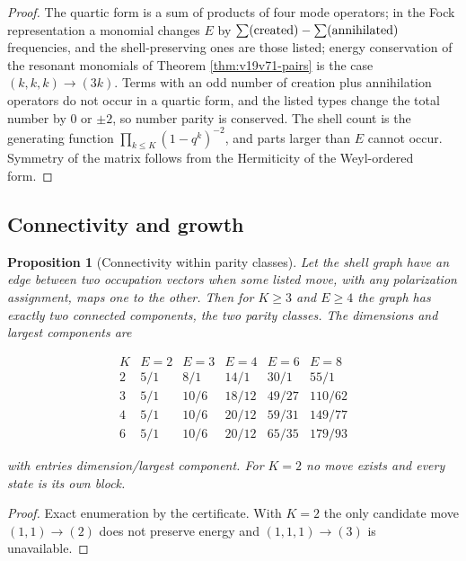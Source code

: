 \documentclass[11pt]{article}
\newtheorem{proposition}[theorem]{Proposition}
\theoremstyle{remark}
\begin{document}
\begin{proof}
The quartic form is a sum of products of four mode operators; in the
Fock representation a monomial changes \(E\) by \(\sum(\hbox{created})-\sum(\hbox{annihilated})\)
frequencies, and the shell-preserving ones are those listed; energy
conservation of the resonant monomials of Theorem
\ref{thm:v19v71-pairs} is the case \((k,k,k)\to(3k)\).  Terms with an
odd number of creation plus annihilation operators do not occur in a
quartic form, and the listed types change the total number by \(0\) or
\(\pm2\), so number parity is conserved.  The shell count is the
generating function \(\prod_{k\leq K}(1-q^k)^{-2}\), and parts larger
than \(E\) cannot occur.  Symmetry of the matrix follows from the
Hermiticity of the Weyl-ordered form.
\end{proof}

\subsection{Connectivity and growth}

\begin{proposition}[Connectivity within parity classes]
\label{prop:v19v73-connectivity}
Let the shell graph have an edge between two occupation vectors when
some listed move, with any polarization assignment, maps one to the
other.  Then for \(K\geq3\) and \(E\geq4\) the graph has exactly two
connected components, the two parity classes.  The dimensions and
largest components are

\[
\begin{array}{c|c|c|c|c|c}
K&E=2&E=3&E=4&E=6&E=8\\ \hline
2&5/1&8/1&14/1&30/1&55/1\\
3&5/1&10/6&18/12&49/27&110/62\\
4&5/1&10/6&20/12&59/31&149/77\\
6&5/1&10/6&20/12&65/35&179/93
\end{array}                                                            \tag{76.1}
\]

with entries dimension/largest component.  For \(K=2\) no move
exists and every state is its own block.
\end{proposition}

\begin{proof}
Exact enumeration by the certificate.  With \(K=2\) the only candidate
move \((1,1)\to(2)\) does not preserve energy and \((1,1,1)\to(3)\) is
unavailable.
\end{proof}
\end{document}
